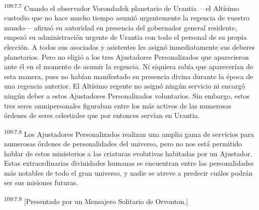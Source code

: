 \par
\textsuperscript{109:7.7} Cuando el observador Vorondadek planetario de Urantia ---el Altísimo custodio que no hace mucho tiempo asumió urgentemente la regencia de vuestro mundo--- afirmó su autoridad en presencia del gobernador general residente, empezó su administración urgente de Urantia con todo el personal de su propia elección. A todos sus asociados y asistentes les asignó inmediatamente sus deberes planetarios. Pero no eligió a los tres Ajustadores Personalizados que aparecieron ante él en el momento de asumir la regencia. Ni siquiera sabía que aparecerían de esta manera, pues no habían manifestado su presencia divina durante la época de una regencia anterior. El Altísimo regente no asignó ningún servicio ni encargó ningún deber a estos Ajustadores Personalizados voluntarios. Sin embargo, estos tres seres omnipersonales figuraban entre los más activos de las numerosas órdenes de seres celestiales que por entonces servían en Urantia.

\par
\textsuperscript{109:7.8} Los Ajustadores Personalizados realizan una amplia gama de servicios para numerosas órdenes de personalidades del universo, pero no nos está permitido hablar de estos ministerios a las criaturas evolutivas habitadas por un Ajustador. Estas extraordinarias divinidades humanas se encuentran entre las personalidades más notables de todo el gran universo, y nadie se atreve a predecir cuáles podrán ser sus misiones futuras.

\par
\textsuperscript{109:7.9} [Presentado por un Mensajero Solitario de Orvonton.]